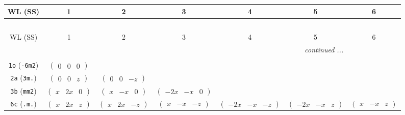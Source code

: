 \documentclass[fleqn,9pt,landscape]{jsarticle}
\begin{document}
\begin{center}
\renewcommand{\arraystretch}{1.2}
\begin{longtable}{ccccccc}
 \hline \hline
WL (SS) & 1 & 2 & 3 & 4 & 5 & 6 \\ \hline \endfirsthead

\multicolumn{6}{l}{\tablename\ \thetable{}} \\
 \hline \hline
WL (SS) & 1 & 2 & 3 & 4 & 5 & 6 \\ \hline \endhead

 \hline \hline
\multicolumn{6}{r}{\footnotesize\it continued ...} \\ \endfoot

 \hline \hline
\multicolumn{6}{r}{} \\ \endlastfoot

{\tt 1o} ({\tt -6m2}) & $ \begin{pmatrix} 0 & 0 & 0 \end{pmatrix} $ & $  $ & $  $ & $  $ & $  $ & $  $ \\ \hline
{\tt 2a} ({\tt 3m.}) & $ \begin{pmatrix} 0 & 0 & z \end{pmatrix} $ & $ \begin{pmatrix} 0 & 0 & - z \end{pmatrix} $ & $  $ & $  $ & $  $ & $  $ \\ \hline
{\tt 3b} ({\tt mm2}) & $ \begin{pmatrix} x & 2 x & 0 \end{pmatrix} $ & $ \begin{pmatrix} x & - x & 0 \end{pmatrix} $ & $ \begin{pmatrix} - 2 x & - x & 0 \end{pmatrix} $ & $  $ & $  $ & $  $ \\ \hline
{\tt 6c} ({\tt .m.}) & $ \begin{pmatrix} x & 2 x & z \end{pmatrix} $ & $ \begin{pmatrix} x & 2 x & - z \end{pmatrix} $ & $ \begin{pmatrix} x & - x & - z \end{pmatrix} $ & $ \begin{pmatrix} - 2 x & - x & - z \end{pmatrix} $ & $ \begin{pmatrix} - 2 x & - x & z \end{pmatrix} $ & $ \begin{pmatrix} x & - x & z \end{pmatrix} $ \\ \hline

\end{longtable}
\end{center}
\end{document}
